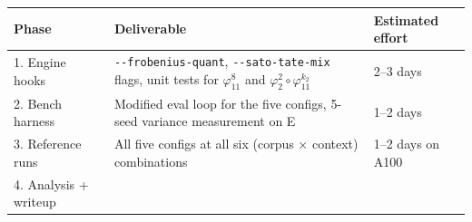 \documentclass[
  11pt,
]{article}
\begin{document}
\begin{longtable}[]{@{}lll@{}}
\toprule
\begin{minipage}[b]{0.30\columnwidth}\raggedright
Phase\strut
\end{minipage} & \begin{minipage}[b]{0.30\columnwidth}\raggedright
Deliverable\strut
\end{minipage} & \begin{minipage}[b]{0.30\columnwidth}\raggedright
Estimated effort\strut
\end{minipage}\tabularnewline
\midrule
\endhead
\begin{minipage}[t]{0.30\columnwidth}\raggedright
1. Engine hooks\strut
\end{minipage} & \begin{minipage}[t]{0.30\columnwidth}\raggedright
\texttt{-\/-frobenius-quant}, \texttt{-\/-sato-tate-mix} flags, unit
tests for \(\varphi_{11}^8\) and
\(\varphi_2^2 \circ \varphi_{11}^{k_2}\)\strut
\end{minipage} & \begin{minipage}[t]{0.30\columnwidth}\raggedright
2--3 days\strut
\end{minipage}\tabularnewline
\begin{minipage}[t]{0.30\columnwidth}\raggedright
2. Bench harness\strut
\end{minipage} & \begin{minipage}[t]{0.30\columnwidth}\raggedright
Modified eval loop for the five configs, 5-seed variance measurement on
E\strut
\end{minipage} & \begin{minipage}[t]{0.30\columnwidth}\raggedright
1--2 days\strut
\end{minipage}\tabularnewline
\begin{minipage}[t]{0.30\columnwidth}\raggedright
3. Reference runs\strut
\end{minipage} & \begin{minipage}[t]{0.30\columnwidth}\raggedright
All five configs at all six (corpus × context) combinations\strut
\end{minipage} & \begin{minipage}[t]{0.30\columnwidth}\raggedright
1--2 days on A100\strut
\end{minipage}\tabularnewline
\begin{minipage}[t]{0.30\columnwidth}\raggedright
4. Analysis + writeup\strut
\end{minipage} & \begin{minipage}[t]{0.30\columnwidth}\raggedright

\end{minipage}
\end{longtable}
\end{document}
